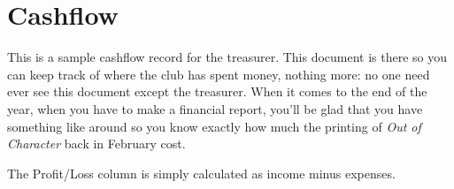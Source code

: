 \section{Cashflow}
\label{sec:cashflow}

This is a sample cashflow record for the treasurer. This document is there so you can keep track of where the club has spent money, nothing more: no one need ever see this document except the treasurer. When it comes to the end of the year, when you have to make a financial report, you'll be glad that you have something like around so you know exactly how much the printing of \textit{Out of Character} back in February cost.

The Profit/Loss column is simply calculated as income minus expenses.

